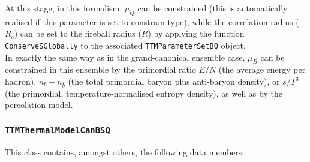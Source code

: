 \documentclass{elsarticle}
\begin{document}
At this stage, in this formalism, $\mu_Q$ can be constrained 
(this is automatically realised if this parameter is set to constrain-type), while the 
correlation radius ($R_c$) can be set to the fireball radius ($R$) by applying the function 
\texttt{ConserveSGlobally} to the associated \texttt{TTMParameterSetBQ} object.\\

In exactly the same way as in the grand-canonical ensemble case, $\mu_B$ can 
be constrained in this ensemble by the primordial ratio $E/N$ (the average 
energy per 
hadron), $n_b+n_{\bar{b}}$ (the total primordial baryon plus anti-baryon 
density), or $s/T^3$ (the primordial, temperature-normalised entropy density), as well 
as by the percolation model.\\
 
\subsubsection{\texttt{TTMThermalModelCanBSQ}}

This class contains, amongst others, the following data members:\\
\end{document}
